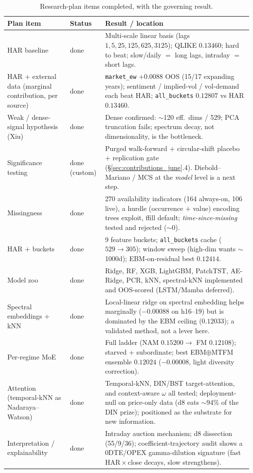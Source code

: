 \begin{table}[H]
\centering
\small
\caption{Research-plan items completed, with the governing result.}
\label{tab:plan_now}
\begin{tabular}{p{4.3cm} p{1.3cm} p{7.2cm}}
\toprule
Plan item & Status & Result / location \\
\midrule
HAR baseline & done & Multi-scale linear basis (lags $1,5,25,125,625,3125$); QLIKE $0.13460$; hard to beat; slow/daily $=$ long lags, intraday $=$ short lags. \\
HAR + external data (marginal contribution, per source) & done & \texttt{market\_ew} $+0.0088$ OOS (15/17 expanding years); sentiment / implied-vol / vol-demand each beat HAR; \texttt{all\_buckets} $0.12807$ vs HAR $0.13460$. \\
Weak / dense-signal hypothesis (Xiu) & done & Dense confirmed: $\sim$120 eff.\ dims / 529; PCA truncation fails; spectrum decay, not dimensionality, is the bottleneck. \\
Significance testing & done (custom) & Purged walk-forward + circular-shift placebo + replication gate (\S\ref{sec:contributions_june}.4). Diebold--Mariano / MCS at the \emph{model} level is a next step. \\
Missingness & done & 270 availability indicators (164 always-on, 106 live), a hurdle (occurrence $+$ value) encoding trees exploit, ffill default; \emph{time-since-missing} tested and rejected ($\sim$0). \\
HAR $+$ buckets & done & 9 feature buckets; \texttt{all\_buckets} cache ($529\!\to\!305$); window sweep (high-dim wants $\sim$1000d); EBM-on-residual best $0.12414$. \\
Model zoo & done & Ridge, RF, XGB, LightGBM, PatchTST, AE-Ridge, PCR, kNN, spectral-kNN implemented and OOS-scored (LSTM/Mamba deferred). \\
Spectral embeddings $+$ kNN & done & Local-linear ridge on spectral embedding helps marginally ($-0.00088$ on h16--19) but is dominated by the EBM ceiling ($0.12033$); a validated method, not a lever here. \\
Per-regime MoE & done & Full ladder (NAM $0.15200 \to$ FM $0.12108$); starved + subordinate; best EBM$\oplus$MTFM ensemble $0.12024$ ($-0.00008$, light diversity correction). \\
Attention (temporal-kNN as Nadaraya--Watson) & done & Temporal-kNN, DIN/BST target-attention, and context-aware $\omega$ all tested; deployment-null on price-only data (d8 eats $\sim$94\% of the DIN prize); positioned as the substrate for new information. \\
Interpretation / explainability & done & Intraday auction mechanism; d8 dissection (55/9/36); coefficient-trajectory audit shows a 0DTE/OPEX gamma-dilution signature (fast $\mathrm{HAR}\times$close decays, slow strengthens). \\
\bottomrule
\end{tabular}
\end{table}

